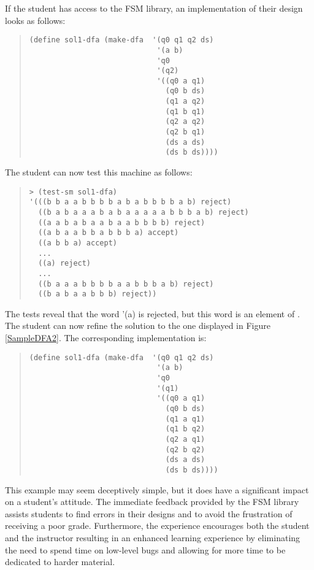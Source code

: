 \documentclass{eptcs}
\begin{document}
If the student has access to the \textsf{FSM} library, an implementation of their design looks as follows:
\begin{quote}
\begin{verbatim}
(define sol1-dfa (make-dfa  '(q0 q1 q2 ds)
                             '(a b)
                             'q0
                             '(q2)
                             '((q0 a q1)
                               (q0 b ds)
                               (q1 a q2)
                               (q1 b q1)
                               (q2 a q2)
                               (q2 b q1)
                               (ds a ds)
                               (ds b ds))))
\end{verbatim}
\end{quote}
The student can now test this machine as follows:
\begin{quote}
\begin{verbatim}
> (test-sm sol1-dfa)
'(((b b a a b b b b a b a b b b b a b) reject)
  ((b a b a a a b a b a a a a a b b b a b) reject)
  ((a a b a b a a b a a b b b b) reject)
  ((a b a a b b a b b b a) accept)
  ((a b b a) accept)
  ...
  ((a) reject)
  ...
  ((b a a a b b b b a a b b b a b) reject)
  ((b a b a a b b b) reject))
\end{verbatim}
\end{quote}
The tests reveal that the word \textsf{'(a)} is rejected, but this word is an element of . The student can now refine the solution to the one displayed in Figure \ref{SampleDFA2}. The corresponding implementation is:
\begin{quote}
\begin{verbatim}
(define sol1-dfa (make-dfa  '(q0 q1 q2 ds)
                             '(a b)
                             'q0
                             '(q1)
                             '((q0 a q1)
                               (q0 b ds)
                               (q1 a q1)
                               (q1 b q2)
                               (q2 a q1)
                               (q2 b q2)
                               (ds a ds)
                               (ds b ds))))
\end{verbatim}
\end{quote}

This example may seem deceptively simple, but it does have a significant impact on a student's attitude. The immediate feedback provided by the \textsf{FSM} library assists students to find errors in their designs and to avoid the frustration of receiving a poor grade. Furthermore, the experience encourages both the student and the instructor resulting in an enhanced learning experience by eliminating the need to spend time on low-level bugs and allowing for more time to be dedicated to harder material.
\end{document}
